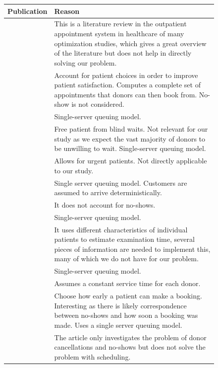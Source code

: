 \documentclass[a4paper,12pt]{article}
\begin{document}
\begin{figure}[H]
    \centering
    
    \begin{table}[H]
    \begin{tabularx}{\textwidth}{@{} c Y @{}}
    \toprule
    Publication & Reason \\ \midrule
    \cite{BD32}        &    This is a literature review in the outpatient appointment system in healthcare of many optimization studies, which gives a great overview of the literature but does not help in directly solving our problem.  \\
    \cite{BD45}        &    Account for patient choices in order to improve patient satisfaction. Computes a complete set of appointments that donors can then book from. No-show is not considered. \\
    \cite{BD36}        &    Single-server queuing model. \\
    \cite{BD43}        &    Free patient from blind waits. Not relevant for our study as we expect the vast majority of donors to be unwilling to wait. Single-server queuing model. \\
    \cite{BD20}        &    Allows for urgent patients. Not directly applicable to our study. \\
    \cite{BD04}        &    Single server queuing model. Customers are assumed to arrive deterministically. \\
    \cite{BD08}        &    It does not account for no-shows. \\
    \cite{BD13}        &    Single-server queuing model. \\
    \cite{BD30}        &    It uses different characteristics of individual patients to estimate examination time, several pieces of information are needed to implement this, many of which we do not have for our problem. \\
    \cite{BD23}        &    Single-server queuing model. \\
    \cite{BD12}        &    Assumes a constant service time for each donor. \\
    \cite{BD26}        &    Choose how early a patient can make a booking. Interesting as there is likely correspondence between no-shows and how soon a booking was made. Uses a single server queuing model. \\
    \cite{BD10}        &    The article only investigates the problem of donor cancellations and no-shows but does not solve the problem with scheduling. \\ 

\end{tabularx}
\end{table}
\end{figure}
\end{document}
